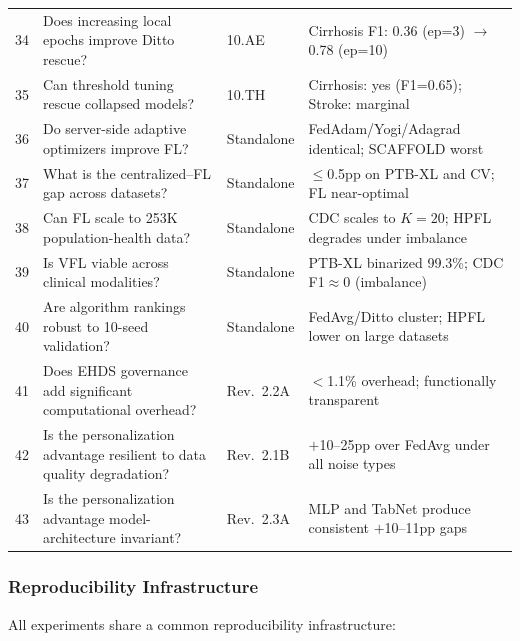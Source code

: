 \documentclass[conference]{IEEEtran}
\begin{document}
\begin{table}[htbp]
{\begin{tabular}{clll}
34 & Does increasing local epochs improve Ditto rescue? & 10.AE & Cirrhosis F1: 0.36 (ep=3) $\to$ 0.78 (ep=10) \\
35 & Can threshold tuning rescue collapsed models? & 10.TH & Cirrhosis: yes (F1=0.65); Stroke: marginal \\
\midrule
36 & Do server-side adaptive optimizers improve FL? & Standalone & FedAdam/Yogi/Adagrad identical; SCAFFOLD worst \\
37 & What is the centralized--FL gap across datasets? & Standalone & $\leq$0.5pp on PTB-XL and CV; FL near-optimal \\
38 & Can FL scale to 253K population-health data? & Standalone & CDC scales to $K{=}20$; HPFL degrades under imbalance \\
39 & Is VFL viable across clinical modalities? & Standalone & PTB-XL binarized 99.3\%; CDC F1$\approx$0 (imbalance) \\
40 & Are algorithm rankings robust to 10-seed validation? & Standalone & FedAvg/Ditto cluster; HPFL lower on large datasets \\
\midrule
41 & Does EHDS governance add significant computational overhead? & Rev.~2.2A & $<$1.1\% overhead; functionally transparent \\
42 & Is the personalization advantage resilient to data quality degradation? & Rev.~2.1B & $+$10--25pp over FedAvg under all noise types \\
43 & Is the personalization advantage model-architecture invariant? & Rev.~2.3A & MLP and TabNet produce consistent $+$10--11pp gaps \\
\bottomrule
\end{tabular}%
}
\end{table}


\subsubsection{Reproducibility Infrastructure}

All experiments share a common reproducibility infrastructure:
\end{document}
